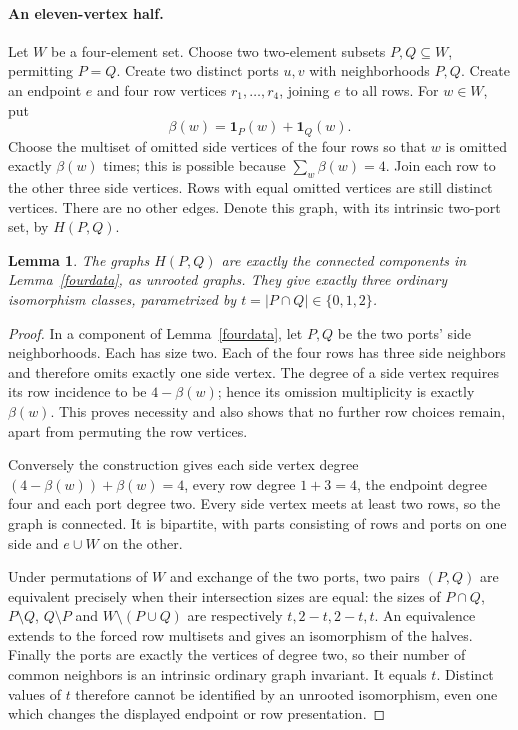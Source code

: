 \documentclass[11pt]{article}
\newtheorem{lemma}[theorem]{Lemma}
\begin{document}
\paragraph{An eleven-vertex half.}
Let $W$ be a four-element set. Choose two two-element subsets
$P,Q\subseteq W$, permitting $P=Q$. Create two distinct ports $u,v$
with neighborhoods $P,Q$. Create an endpoint $e$ and four row vertices
$r_1,\ldots,r_4$, joining $e$ to all rows. For $w\in W$, put
\[
 \beta(w)=\boldsymbol1_P(w)+\boldsymbol1_Q(w).
\]
Choose the multiset of omitted side vertices of the four rows so that
$w$ is omitted exactly $\beta(w)$ times; this is possible because
$\sum_w\beta(w)=4$. Join each row to the other three side vertices.
Rows with equal omitted vertices are still distinct vertices. There
are no other edges. Denote this graph, with its intrinsic two-port
set, by $H(P,Q)$.

\begin{lemma}\label{half}
The graphs $H(P,Q)$ are exactly the connected components in
Lemma~\ref{fourdata}, as unrooted graphs. They give exactly three
ordinary isomorphism classes, parametrized by
$t=|P\cap Q|\in\{0,1,2\}$.
\end{lemma}
\begin{proof}
In a component of Lemma~\ref{fourdata}, let $P,Q$ be the two ports'
side neighborhoods. Each has size two. Each of the four rows has
three side neighbors and therefore omits exactly one side vertex.
The degree of a side vertex requires its row incidence to be
$4-\beta(w)$; hence its omission multiplicity is exactly $\beta(w)$.
This proves necessity and also shows that no further row choices
remain, apart from permuting the row vertices.

Conversely the construction gives each side vertex degree
$(4-\beta(w))+\beta(w)=4$, every row degree $1+3=4$, the endpoint
degree four and each port degree two. Every side vertex meets at
least two rows, so the graph is connected. It is bipartite, with
parts consisting of rows and ports on one side and $e\cup W$ on
the other.

Under permutations of $W$ and exchange of the two ports, two pairs
$(P,Q)$ are equivalent precisely when their intersection sizes are
equal: the sizes of $P\cap Q$, $P\setminus Q$, $Q\setminus P$ and
$W\setminus(P\cup Q)$ are respectively $t,2-t,2-t,t$.
An equivalence extends to the forced row multisets and gives an
isomorphism of the halves. Finally the ports are exactly the vertices
of degree two, so their number of common neighbors is an intrinsic
ordinary graph invariant. It equals $t$. Distinct values of $t$
therefore cannot be identified by an unrooted isomorphism, even one
which changes the displayed endpoint or row presentation.
\end{proof}
\end{document}
